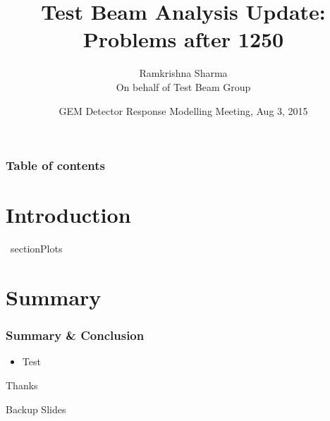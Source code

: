 \documentclass[slidestop,compress,mathserif]{beamer}
\title[Problems of TB]{Test Beam Analysis Update: Problems after 1250}
\author[Ramkrishna Sharma]{Ramkrishna Sharma\\On behalf of Test Beam Group}
\date[Aug 4, 2015]{GEM Detector Response Modelling Meeting, Aug 3, 2015}
\begin{document}
\renewcommand{\inserttotalframenumber}{\pageref{lastslide}}
\begin{frame}
\titlepage
\end{frame}

\begin{frame}\frametitle{Table of contents}\tableofcontents
\end{frame}
\section{Introduction}
 
\ section{Plots}

\section{Summary}
\label{lastslide}
\begin{frame}\frametitle{Summary \& Conclusion}
  \begin{itemize}
    \item Test
  \end{itemize}
\end{frame}



\begin{frame}[c]
	\begin{center}
	\Huge Thanks
	\end{center}
\end{frame}

\begin{frame}[c]
	\begin{center}
	\Huge Backup Slides
	\end{center}
\end{frame}
\end{document}
